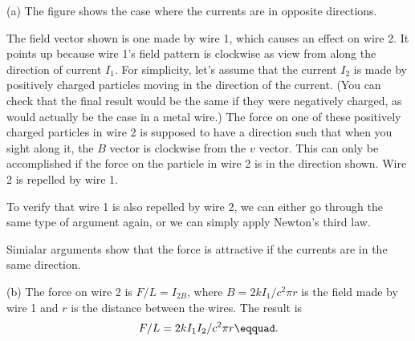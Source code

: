 (a) The figure shows the case where the currents are in
opposite directions.


The field vector shown is one made by wire 1, which causes
an effect on wire 2. It points up because wire 1's field
pattern is clockwise as view from along the direction of
current $I_1$. For simplicity, let's assume that the current
$I_2$ is made by positively charged particles moving in the
direction of the current. (You can check that the final
result would be the same if they were negatively charged, as
would actually be the case in a metal wire.) The force on
one of these positively charged particles in wire 2 is
supposed to have a direction such that when you sight along
it, the $B$ vector is clockwise from the $v$ vector. This
can only be accomplished if the force on the particle in
wire 2 is in the direction shown. Wire 2 is repelled by wire 1.

To verify that wire 1 is also repelled by wire 2, we can
either go through the same type of argument again, or we can
simply apply Newton's third law.

Simialar arguments show that the force is attractive if the
currents are in the same direction.

(b) The force on wire 2 is $F/L=I_{2B}$, where $B=2k I_1/c^2\pi r$ is the field made by wire 1 and $r$ is the distance
between the wires. The result is
\begin{equation*}
		F/L=2k I_1I_2/c^2\pi r\eqquad.  
\end{equation*}
